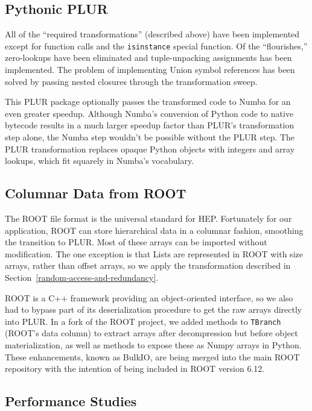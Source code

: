 \documentclass[10pt, conference, compsocconf]{IEEEtran}
\begin{document}
\subsection{Pythonic PLUR}

All of the ``required transformations'' (described above) have been implemented except for function calls and the {\tt isinstance} special function. Of the ``flourishes,'' zero-lookups have been eliminated and tuple-unpacking assignments has been implemented. The problem of implementing Union symbol references has been solved by passing nested closures through the transformation sweep.

This PLUR package optionally passes the transformed code to Numba\cite{numba} for an even greater speedup. Although Numba's conversion of Python code to native bytecode results in a much larger speedup factor than PLUR's transformation step alone, the Numba step wouldn't be possible without the PLUR step. The PLUR transformation replaces opaque Python objects with integers and array lookups, which fit squarely in Numba's vocabulary.

\subsection{Columnar Data from ROOT}

The ROOT file format is the universal standard for HEP. Fortunately for our application, ROOT can store hierarchical data in a columnar fashion, smoothing the transition to PLUR. Most of these arrays can be imported without modification. The one exception is that Lists are represented in ROOT with size arrays, rather than offset arrays, so we apply the transformation described in Section~\ref{random-access-and-redundancy}.

ROOT is a C++ framework providing an object-oriented interface, so we also had to bypass part of its deserialization procedure to get the raw arrays directly into PLUR. In a fork of the ROOT project\cite{bulkio}, we added methods to {\tt TBranch} (ROOT's data column) to extract arrays after decompression but before object materialization, as well as methods to expose these as Numpy arrays in Python. These enhancements, known as BulkIO, are being merged into the main ROOT repository with the intention of being included in ROOT version 6.12.

\subsection{Performance Studies}
\end{document}
